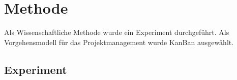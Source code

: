 \chapter{Methode}\label{ch:Methode}


Als Wissenschaftliche Methode wurde ein Experiment durchgeführt.
Als Vorgehensmodell für das Projektmanagement wurde KanBan ausgewählt.



\section{Experiment}\label{sec:experiment}


